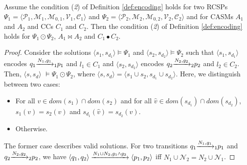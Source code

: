\begin{lemma} %
\label{lem:com2}
Assume the condition (\textit{2}) of Definition \ref{def:encoding} holds for two RCSPs $\Psi_1 = \langle \mathcal{P}_1, \mathcal{M}_1, \mathcal{M}_{0,1}, \mathcal{V}_1, \mathcal{C}_1 \rangle$ and $\Psi_2 = \langle \mathcal{P}_2, \mathcal{M}_2, \mathcal{M}_{0,2}, \mathcal{V}_2, \mathcal{C}_2 \rangle$ and for CASMs $A_1$ and $A_2$ and CCs $C_1$ and $C_2$. Then the condition (\textit{2}) of Definition \ref{def:encoding} holds for $\Psi_1 \odot \Psi_2$, $A_1 \bowtie A_2$ and $C_1 \bullet C_2$.
\end{lemma}

\noindent
\begin{proof}
Consider the solutions $\langle s_{1}, s_{d_{1}} \rangle \vDash \Psi_{1}$ and $\langle s_{2}, s_{d_{2}} \rangle \vDash \Psi_{2}$ %
such that $\langle s_{1}, s_{d_{1}} \rangle$ encodes $q_{1}{\xrightarrow{N_{1},g_{1}}_{1}}p_{1}$ and $l_{1} \in C_{1}$ and $\langle s_{2}, s_{d_{2}} \rangle$ encodes $q_{2}{\xrightarrow{N_{2},g_{2}}_{2}}p_{2}$ and $l_{2} \in C_{2}$. Then, $\langle s, s_d \rangle $ $\vDash \Psi_1 \odot \Psi_2$, where $\langle s, s_d \rangle = \langle s_1 \cup s_2, s_{d_1} \cup s_{d_2} \rangle$. Here, we distinguish between two cases:

\begin{itemize}
\item For all $v \in dom(s_1) \cap dom(s_2)$ and for all $\hat{v} \in dom(s_{d_1}) \cap dom(s_{d_2})$,  $s_1(v)=s_2(v)$ and $s_{d_1}(\hat{v})=s_{d_2}(\hat{v})$.
\item Otherwise.
\end{itemize}  

\noindent
The former case describes valid solutions. For two transitions $q_{1}{\xrightarrow{N_{1}, g_{1}}_{1}}p_{1}$ and $q_{2}{\xrightarrow{N_{2}, g_{2}}_{2}}p_{2}$, we have $\langle q_1,q_2 \rangle\xrightarrow{N_1\cup N_2, g_1 \wedge g_2}\langle p_1,p_2 \rangle$ iff $N_1 \cup \mathcal{N}_2 = N_2 \cup \mathcal{N}_1$. 


\end{proof}
